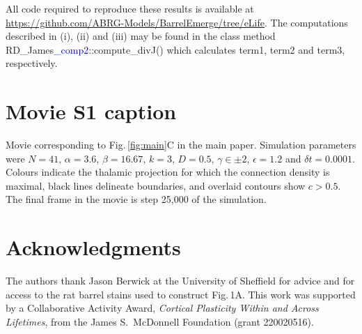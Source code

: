 \documentclass[9pt,lineno]{elife}
\newcommand{\cmnt}[1]{\textcolor{blue}{#1}}
\newcommand{\code}[1]{\textsf{#1}}
\begin{document}
All code required to reproduce these results is available at
\url{https://github.com/ABRG-Models/BarrelEmerge/tree/eLife}. The
computations described in (i), (ii) and (iii) may be found in the class method
\code{RD\_James\cmnt{\_comp2}::compute\_divJ()} which calculates \code{term1}, \code{term2}
and \code{term3}, respectively.

\section{Movie S1 caption}

Movie corresponding to Fig.\,\ref{fig:main}C in the main paper. Simulation parameters were
$N=41$, $\alpha=3.6$, $\beta=16.67$, $k=3$, $D=0.5$, $\gamma\in\pm 2$,
$\epsilon=1.2$ and $\delta{t}=0.0001$. Colours indicate the thalamic
projection for which the connection density is maximal, black lines delineate
boundaries, and overlaid contours show $c>0.5$. The final frame in the movie
is step 25,000 of the simulation.

\section{Acknowledgments}

The authors thank Jason Berwick at the University of Sheffield for advice and
for access to the rat barrel stains used to construct Fig.\,1A. This work was
supported by a Collaborative Activity Award, \emph{Cortical Plasticity Within
  and Across Lifetimes}, from the James S.~McDonnell Foundation (grant
220020516).


\end{document}
